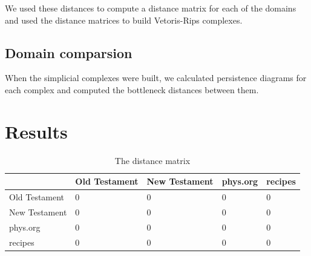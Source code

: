 \documentclass[12pt,a4paper]{amsart}
\begin{document}
We used these distances to compute a distance matrix for each of the
domains and used the distance matrices to build Vetoris-Rips complexes.

\subsection{Domain comparsion}

When the simplicial complexes were built, we calculated persistence diagrams for
each complex and computed the bottleneck distances between them.

\section{Results}

\begin{table}
  \centering
  \begin{tabular}{l|llll}
                  & Old Testament & New Testament & phys.org & recipes \\ \hline
    Old Testament & 0 & 0 & 0 & 0 \\
    New Testament & 0 & 0 & 0 & 0 \\
    phys.org      & 0 & 0 & 0 & 0 \\
    recipes       & 0 & 0 & 0 & 0 \\
  \end{tabular}
  \caption{The distance matrix}
  \label{tab:}
\end{table}
\end{document}
